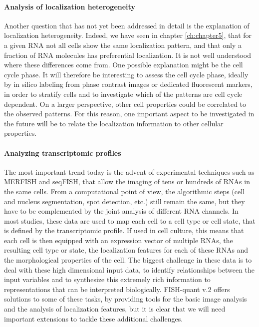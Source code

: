 \paragraph{Analysis of localization heterogeneity}
Another question that has not yet been addressed in detail is the explanation of localization heterogeneity. Indeed, we have seen in chapter \ref{ch:chapter5}, that for a given RNA not all cells show the same localization pattern, and that only a fraction of RNA molecules has preferential localization. It is not well understood where these differences come from. One possible explanation might be the cell cycle phase. It will therefore be interesting to assess the cell cycle phase, ideally by in silico labeling from phase contrast images or dedicated fluorescent markers, in order to stratify cells and to investigate which of the patterns are cell cycle dependent. On a larger perspective, other cell properties could be correlated to the observed patterns. For this reason, one important aspect to be investigated in the future will be to relate the localization information to other cellular properties.

\paragraph{Analyzing transcriptomic profiles}
The most important trend today is the advent of experimental techniques such as MERFISH and seqFISH, that allow the imaging of tens or hundreds of RNAs in the same cells. From a computational point of view, the algorithmic steps (cell and nucleus segmentation, spot detection, etc.) still remain the same, but they have to be complemented by the joint analysis of different RNA channels. In most studies, these data are used to map each cell to a cell type or cell state, that is defined by the transcriptomic profile. If used in cell culture, this means that each cell is then equipped with an expression vector of multiple RNAs, the resulting cell type or state, the localization features for each of these RNAs and the morphological properties of the cell. The biggest challenge in these data is to deal with these high dimensional input data, to identify relationships between the input variables and to synthesize this extremely rich information to representations that can be interpreted biologically. FISH-quant v.2 offers solutions to some of these tasks, by providing tools for the basic image analysis and the analysis of localization features, but it is clear that we will need important extensions to tackle these additional challenges. 

